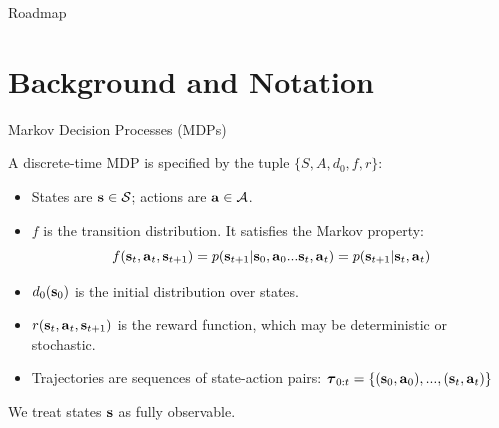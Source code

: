 \documentclass[]{beamer}
\begin{document}
\begin{frame}{Roadmap}

    \tableofcontents


\end{frame}

\section{Background and Notation}

\begin{frame}{Markov Decision Processes (MDPs)}

A discrete-time MDP is specified by the tuple $\{S, A, d_0, f, r\}$:

\begin{itemize}
    \item States are $\vs \in \cS$; actions are $\va \in \cA$.
    \item $f$ is the transition distribution. It satisfies the Markov property:
    \[ f(\vs_t, \va_t, \vs_{t+1}) = p(\vs_{t+1}|\vs_0, \va_0 ... \vs_t, \va_t) = p(\vs_{t+1}|\vs_t, \va_t) \]
    \item $d_0(\vs_0)$ is the initial distribution over states.
    \item $r(\vs_{t}, \va_{t}, \vs_{t+1})$ is the reward function, which may be deterministic or stochastic.
    \item Trajectories are sequences of state-action pairs: $\vtau_{0:t} = \{(\vs_0, \va_0), ..., (\vs_t, \va_t) \}$
\end{itemize}

We treat states $\vs$ as fully observable.

\end{frame}
\end{document}
